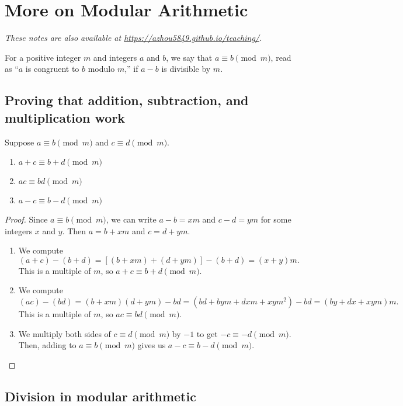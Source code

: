 \section{More on Modular Arithmetic}

\textit{These notes are also available at \url{https://azhou5849.github.io/teaching/}.}

For a positive integer $m$ and integers $a$ and $b$, we say that $a\equiv b\pmod{m}$, read as ``$a$ is congruent to $b$ modulo $m$,'' if $a - b$ is divisible by $m$.

\subsection{Proving that addition, subtraction, and multiplication work}

\begin{proposition}
Suppose $a\equiv b\pmod{m}$ and $c\equiv d\pmod{m}$.
\begin{enumerate}
\item $a + c\equiv b + d\pmod{m}$
\item $ac\equiv bd\pmod{m}$
\item $a - c\equiv b - d\pmod{m}$
\end{enumerate}
\end{proposition}
\begin{proof}
Since $a\equiv b\pmod{m}$, we can write $a - b = xm$ and $c - d = ym$ for some integers $x$ and $y$. Then $a = b + xm$ and $c = d + ym$.
\begin{enumerate}
\item We compute
\begin{equation*}
(a + c) - (b + d) = [(b + xm) + (d + ym)] - (b + d) = (x + y)m.
\end{equation*}
This is a multiple of $m$, so $a + c\equiv b + d\pmod{m}$.
\item We compute 
\begin{equation*}
(ac) - (bd) = (b + xm)(d + ym) - bd = (bd + bym + dxm + xym^2) - bd = (by + dx + xym)m.
\end{equation*}
This is a multiple of $m$, so $ac\equiv bd\pmod{m}$.
\item We multiply both sides of $c\equiv d\pmod{m}$ by $-1$ to get $-c\equiv -d\pmod{m}$. Then, adding to $a\equiv b\pmod{m}$ gives us $a - c\equiv b - d\pmod{m}$.
\end{enumerate}
\end{proof}


\subsection{Division in modular arithmetic}